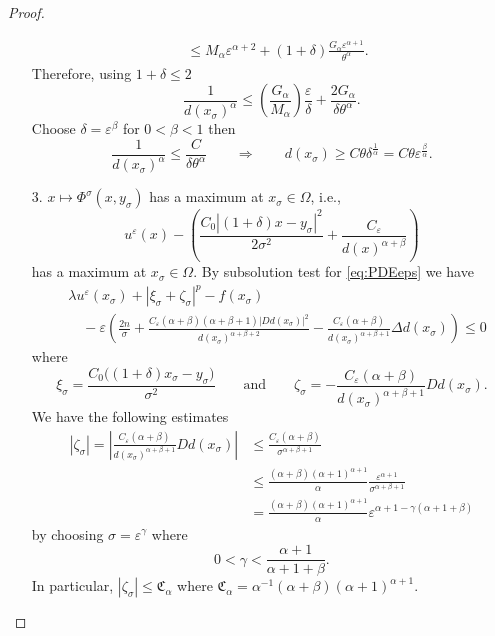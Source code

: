 \documentclass[11pt,reqno]{amsart}
\numberwithin{figure}{section}
\theoremstyle{plain}
\theoremstyle{remark}
\numberwithin{equation}{section}
\begin{document}
\begin{proof}
\begin{enumerate}
\begin{align*}
        &\leq M_\alpha\varepsilon^{\alpha+2} + \left(1+\delta\right)\frac{G_\alpha\varepsilon^{\alpha+1}}{\theta^{\alpha}}.
    \end{align*}
    Therefore, using $1+\delta\leq 2$
    \begin{equation*}
        \frac{1}{d(x_\sigma)^\alpha}\leq \left(\frac{G_\alpha}{M_\alpha}\right) \frac{\varepsilon}{\delta} + \frac{2G_\alpha}{\delta\theta^\alpha}  .
    \end{equation*}
    Choose $\delta = \varepsilon^\beta$ for $0<\beta<1$ then 
    \begin{equation*}
        \frac{1}{d(x_\sigma)^\alpha} \leq \frac{C}{\delta\theta^\alpha} \qquad\Longrightarrow\qquad    d(x_\sigma)\geq C\theta \delta^{\frac{1}{\alpha}} = C\theta\varepsilon^{\frac{\beta}{\alpha}}.
    \end{equation*}
     \item[3.] $x\mapsto \Phi^\sigma(x,y_\sigma)$ has a maximum at $x_\sigma\in \Omega$, i.e.,
    \begin{equation*}
        u^\varepsilon(x) - \left(\frac{C_0|(1+\delta)x-y_\sigma|^2}{2\sigma^2} + \frac{C_\varepsilon}{d(x)^{\alpha+\beta}}\right)
    \end{equation*}
    has a maximum at $x_\sigma\in \Omega$. By subsolution test for \eqref{eq:PDEeps} we have
\begin{align}\label{e:sub1}
    &\lambda u^\varepsilon(x_\sigma) + \left|\xi_\sigma+\zeta_\sigma\right|^p - f(x_\sigma)\nonumber\\
    &\quad  -\varepsilon\left(\frac{2n}{\sigma} + \frac{C_\varepsilon(\alpha+\beta)(\alpha+\beta+1)|D d(x_\sigma)|^2}{d(x_\sigma)^{\alpha+\beta+2}}-\frac{C_\varepsilon(\alpha+\beta)}{d(x_\sigma)^{\alpha+\beta+1}}\Delta d(x_\sigma)\right)  \leq 0
\end{align}
where 
\begin{equation}\label{e:est_xi_zeta}
    \xi_\sigma = \frac{C_0\big((1+\delta)x_\sigma-y_\sigma\big)}{\sigma^2} \qquad\text{and}\qquad \zeta_\sigma = - \frac{C_\varepsilon(\alpha+\beta)}{d(x_\sigma)^{\alpha+\beta+1}}D d(x_\sigma).
\end{equation}
We have the following estimates
\begin{align*}
    |\zeta_\sigma|=\left|\frac{C_\varepsilon(\alpha+\beta)}{d(x_\sigma)^{\alpha+\beta+1}}D d(x_\sigma )\right|
    &\leq \frac{C_\varepsilon(\alpha+\beta)}{\sigma^{\alpha+\beta+1}} \\
    &\leq \frac{(\alpha+\beta)(\alpha+1)^{\alpha+1}}{\alpha} \frac{\varepsilon^{\alpha+1}}{\sigma^{\alpha+\beta+1}} \\
    &= \frac{(\alpha+\beta)(\alpha+1)^{\alpha+1}}{\alpha}\varepsilon^{\alpha+1 - \gamma(\alpha+1+\beta)}
\end{align*}
by choosing $\sigma = \varepsilon^\gamma$ where
\begin{equation*}
 \displaystyle 0 < \gamma < \frac{\alpha+1}{\alpha+1+\beta}.
\end{equation*}
In particular, $|\zeta_\sigma|\leq \mathfrak{C}_\alpha$ where $\mathfrak{C}_\alpha = \alpha^{-1}(\alpha+\beta)(\alpha+1)^{\alpha+1}$.
\end{enumerate}
\end{proof}
\end{document}
